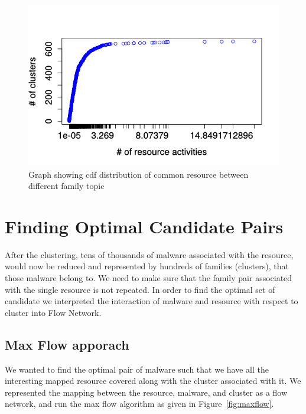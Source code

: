 \begin{figure}[htbp]
\begin{center}
  \includegraphics[scale=0.7]{figures/inter_clustered_common.png}
\end{center}
\captionsetup{font=small}
\caption{Graph showing cdf distribution of common resource between different family topic}
\label{fig:interclustcommon}
\end{figure}

\section{Finding Optimal Candidate Pairs}
\label{sec:Finding Optimal Candidate Pairs}
After the clustering, tens of thousands of malware associated with the resource, would now be reduced and represented by hundreds of families (clusters), that those malware belong to.
We need to make sure that the family pair associated with the single resource is not repeated.
In order to find the optimal set of candidate we interpreted the interaction of malware and resource with respect to cluster into Flow Network.
\subsection{Max Flow apporach}
\label{sub:Max Flow apporach}
We wanted to find the optimal pair of malware such that we have all the interesting mapped resource covered along with the cluster associated with it.
We represented the mapping between the resource, malware, and cluster as a flow network, and run the max flow algorithm as given in Figure~\ref{fig:maxflow}.\\

